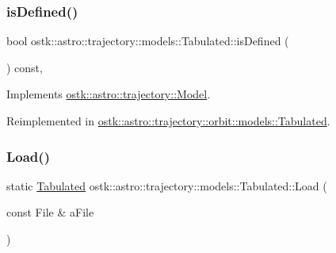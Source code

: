 \mbox{\label{classostk_1_1astro_1_1trajectory_1_1models_1_1_tabulated_a379da4c10a738c3f4578042c9bae0c91}} 
\subsubsection{\texorpdfstring{is\+Defined()}{isDefined()}}
{\footnotesize\ttfamily bool ostk\+::astro\+::trajectory\+::models\+::\+Tabulated\+::is\+Defined (\begin{DoxyParamCaption}{ }\end{DoxyParamCaption}) const\hspace{0.3cm}{\ttfamily [override]}, {\ttfamily [virtual]}}



Implements \hyperlink{classostk_1_1astro_1_1trajectory_1_1_model_a0d5cf6f754905f06c0ec1e39618c20a1}{ostk\+::astro\+::trajectory\+::\+Model}.



Reimplemented in \hyperlink{classostk_1_1astro_1_1trajectory_1_1orbit_1_1models_1_1_tabulated_ad114ba4762b54211f74f0aa3ac5eedae}{ostk\+::astro\+::trajectory\+::orbit\+::models\+::\+Tabulated}.

\mbox{\label{classostk_1_1astro_1_1trajectory_1_1models_1_1_tabulated_a81cf8ebea4354805ab69e732bfe73d77}} 
\subsubsection{\texorpdfstring{Load()}{Load()}}
{\footnotesize\ttfamily static \hyperlink{classostk_1_1astro_1_1trajectory_1_1models_1_1_tabulated}{Tabulated} ostk\+::astro\+::trajectory\+::models\+::\+Tabulated\+::\+Load (\begin{DoxyParamCaption}\item[{const File \&}]{a\+File }\end{DoxyParamCaption})\hspace{0.3cm}{\ttfamily [static]}}

